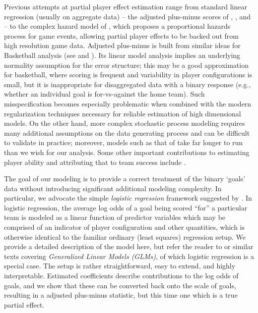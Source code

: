 Previous attempts at partial player effect estimation range from standard
linear regression (usually on aggregate data) -- the adjusted plus-minus
scores of \cite{awa09}, \cite{schlocwel10},  and \cite{mac10} -- to the complex
hazard model of
\cite{ThoVenJen12}, which proposes a proportional hazards process for
game events, allowing partial player effects to be backed out from high
resolution game data. 
Adjusted plus-minus is built from similar ideas for Basketball analysis (see
\cite{ros04} and \cite{ilabar08}). Its linear model analysis implies an
underlying normality assumption for the error structure; this may be a good
approximation for basketball, where scoring is frequent and variability in
player configurations is small, but it is  inappropriate for disaggregated
data with a binary response (e.g., whether an individual goal is
for-vs-against the home team).  Such misspecification becomes especially
problematic when combined with the modern regularization techniques necessary
for reliable estimation of high dimensional models.  On the other hand, more
complex stochastic process modeling requires many additional assumptions on
the data generating process and can be difficult to validate in practice;
moreover, models such as that of \cite{ThoVenJen12} take far longer to run
than we wish for our analysis.  Some other important contributions to
estimating player ability and attributing that to team success include
\cite{stair:etal:2011,pettigrew:2015,mason:foster:2007}.

The goal of our modeling is to provide a correct treatment of the binary
`goals' data without introducing significant additional modeling complexity.
In particular, we advocate the simple \textit{logistic regression} framework
suggested by \cite{gramacy:jensen:taddy:2013}.  In logistic regression, the
average log odds of a goal being scored ``for'' a particular team  is modeled
as a linear function of predictor variables which may be comprised of an
indicator of player configuration and other quantities, which is otherwise
identical to the familiar ordinary (least squares) regression setup.  We
provide a detailed description of the model here, but refer the reader to
\cite{sheather:2009} or similar texts covering {\em Generalized Linear Models
(GLMs)}, of which logistic regression is a special case.
The setup is rather straightforward, easy to
extend, and highly interpretable.  Estimated coefficients describe
contributions to the log odds of goals, and we show that these can be
converted back onto the scale of goals, resulting in a adjusted plus-minus
statistic, but this time one which is a true partial effect.  

